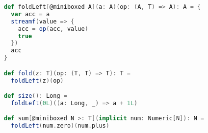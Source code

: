 \begin{lstlisting}[language=scala]
def foldLeft[@miniboxed A](a: A)(op: (A, T) => A): A = {
  var acc = a
  streamf(value => {
    acc = op(acc, value)
    true
  })
  acc
}

def fold(z: T)(op: (T, T) => T): T = 
  foldLeft(z)(op)

def size(): Long = 
  foldLeft(0L)((a: Long, _) => a + 1L)

def sum[@miniboxed N >: T](implicit num: Numeric[N]): N = 
  foldLeft(num.zero)(num.plus)
\end{lstlisting}
